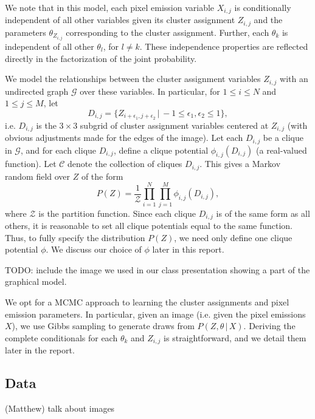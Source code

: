 \documentclass[12pt]{article}
\begin{document}
We note that in this model, each pixel emission variable $X_{i,j}$ is conditionally
independent of all other
variables given its cluster assignment $Z_{i,j}$ and the parameters $\theta_{Z_{i,j}}$
corresponding to the cluster assignment. Further, each $\theta_k$ is independent of all
other $\theta_l$, for $l \neq k$. These independence properties are reflected
directly in the factorization of the joint probability.

We model the relationships between the cluster assignment variables $Z_{i,j}$ with an undirected graph
$\mathcal{G}$ over these variables.
In particular, for $1 \leq i \leq N$ and $1 \leq j \leq M$, let
\[
D_{i,j} = \{Z_{i+\epsilon_1,j+\epsilon_2}\,|\,-1 \leq \epsilon_1, \epsilon_2 \leq 1\},
\]
i.e. $D_{i,j}$ is the $3\times 3$ subgrid of cluster assignment variables centered at $Z_{i,j}$
(with obvious adjustments made for the edges of the image). Let each $D_{i,j}$ be a clique in
$\mathcal{G}$, and for each clique $D_{i,j}$, define a clique potential $\phi_{i,j}(D_{i,j})$
(a real-valued function).
Let $\mathcal{C}$ denote the collection of cliques $D_{i,j}$.
This gives a Markov random field over $Z$ of the form
\[
P(Z) = \frac{1}{\mathcal{Z}}\prod_{i=1}^N\prod_{j=1}^M \phi_{i,j}(D_{i,j}),
\]
where $\mathcal{Z}$ is the partition function.
Since each clique $D_{i,j}$ is of the same form as all others,
it is reasonable to set all clique potentials equal to the same function.
Thus, to fully specify the distribution $P(Z)$, we need only define one clique potential $\phi$.
We discuss our choice of $\phi$ later in this report.

TODO: include the image we used in our class presentation showing a part of the graphical model.

We opt for a MCMC approach to learning the cluster assignments and pixel emission parameters.
In particular, given an image (i.e. given the pixel emissions $X$), we use Gibbs sampling
to generate draws from $P(Z,\theta\, |\, X)$.
Deriving the complete conditionals for each $\theta_k$ and $Z_{i,j}$ is straightforward,
and we detail them later in the report.

\subsection*{Data}(Matthew)
talk about images
\end{document}
